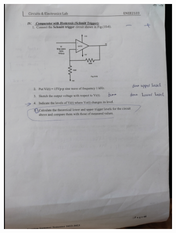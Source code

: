 \documentclass[12pt]{article}
\begin{document}
\clearpage
\begin{figure}[H]
    \centering
    \includegraphics[width=0.8\textwidth]{assets//main/2023-08-27-23-46-18.png}
\end{figure}
\clearpage
\end{document}
